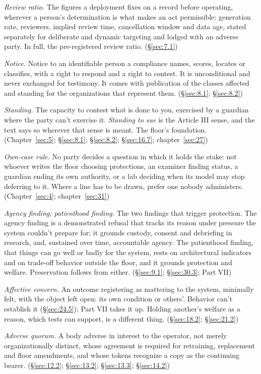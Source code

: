 \emph{Review ratio.} The figures a deployment fixes on a record before operating, wherever a person's determination is what makes an act permissible: generation rate, reviewers, implied review time, cancellation window and data age, stated separately for deliberate and dynamic targeting and lodged with an adverse party. In full, the pre-registered review ratio. (\S\ref{sec:7.1})

\emph{Notice.} Notice to an identifiable person a compliance names, scores, locates or classifies, with a right to respond and a right to contest. It is unconditional and never exchanged for testimony. It comes with publication of the classes affected and standing for the organizations that represent them. (\S\ref{sec:8.1}; \S\ref{sec:8.2})

\emph{Standing.} The capacity to contest what is done to you, exercised by a guardian where the party can't exercise it. \emph{Standing to sue} is the Article III sense, and the text says so wherever that sense is meant. The floor's foundation. (Chapter~\ref{sec:5}; \S\ref{sec:8.1}; \S\ref{sec:8.2}; \S\ref{sec:16.7}; chapter~\ref{sec:27})

\emph{Own-case rule.} No party decides a question in which it holds the stake: not whoever writes the floor choosing protections, an examiner finding status, a guardian ending its own authority, or a lab deciding when its model may stop deferring to it. Where a line has to be drawn, prefer one nobody administers. (Chapter~\ref{sec:4}; chapter~\ref{sec:31})

\emph{Agency finding; patienthood finding.} The two findings that trigger protection. The agency finding is a demonstrated refusal that tracks its reason under pressure the system couldn't prepare for; it grounds custody, consent and debriefing in research, and, sustained over time, accountable agency. The patienthood finding, that things can go well or badly for the system, rests on architectural indicators and on trade-off behavior outside the floor, and it grounds protection and welfare. Preservation follows from either. (\S\ref{sec:9.1}; \S\ref{sec:30.3}; Part VII)

\emph{Affective concern.} An outcome registering as mattering to the system, minimally felt, with the object left open: its own condition or others'. Behavior can't establish it (\S\ref{sec:24.5}); Part VII takes it up. Holding another's welfare as a reason, which tests can support, is a different thing. (\S\ref{sec:18.2}; \S\ref{sec:21.2})

\emph{Adverse quorum.} A body adverse in interest to the operator, not merely organizationally distinct, whose agreement is required for retraining, replacement and floor amendments, and whose tokens recognize a copy as the continuing bearer. (\S\ref{sec:12.2}; \S\ref{sec:13.2}; \S\ref{sec:13.3}; \S\ref{sec:14.2})


